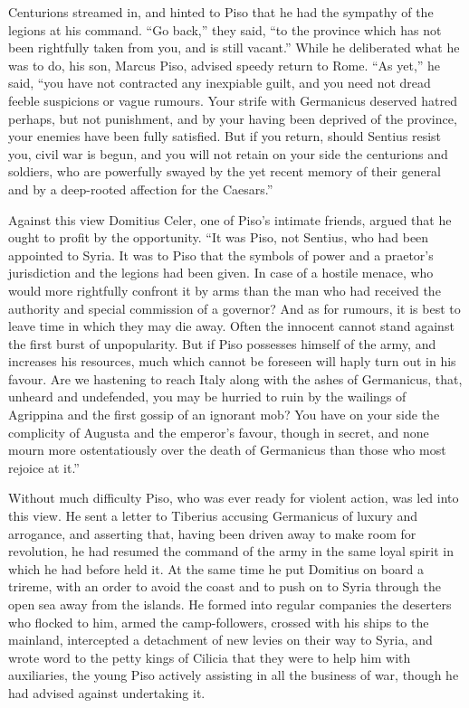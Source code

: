 
Centurions streamed in, and hinted to Piso that he had the sympathy of the legions at his command. ``Go back,'' they said, ``to the province which has not been rightfully taken from you, and is still vacant.'' While he deliberated what he was to do, his son, Marcus Piso, advised speedy return to Rome. ``As yet,'' he said, ``you have not contracted any inexpiable guilt, and you need not dread feeble suspicions or vague rumours. Your strife with Germanicus deserved hatred perhaps, but not punishment, and by your having been deprived of the province, your enemies have been fully satisfied. But if you return, should Sentius resist you, civil war is begun, and you will not retain on your side the centurions and soldiers, who are powerfully swayed by the yet recent memory of their general and by a deep-rooted affection for the Caesars.''


Against this view Domitius Celer, one of Piso's intimate friends, argued that he ought to profit by the opportunity. ``It was Piso, not Sentius, who had been appointed to Syria. It was to Piso that the symbols of power and a praetor's jurisdiction and the legions had been given. In case of a hostile menace, who would more rightfully confront it by arms than the man who had received the authority and special commission of a governor? And as for rumours, it is best to leave time in which they may die away. Often the innocent cannot stand against the first burst of unpopularity. But if Piso possesses himself of the army, and increases his resources, much which cannot be foreseen will haply turn out in his favour. Are we hastening to reach Italy along with the ashes of Germanicus, that, unheard and undefended, you may be hurried to ruin by the wailings of Agrippina and the first gossip of an ignorant mob? You have on your side the complicity of Augusta and the emperor's favour, though in secret, and none mourn more ostentatiously over the death of Germanicus than those who most rejoice at it.''


Without much difficulty Piso, who was ever ready for violent action, was led into this view. He sent a letter to Tiberius accusing Germanicus of luxury and arrogance, and asserting that, having been driven away to make room for revolution, he had resumed the command of the army in the same loyal spirit in which he had before held it. At the same time he put Domitius on board a trireme, with an order to avoid the coast and to push on to Syria through the open sea away from the islands. He formed into regular companies the deserters who flocked to him, armed the camp-followers, crossed with his ships to the mainland, intercepted a detachment of new levies on their way to Syria, and wrote word to the petty kings of Cilicia that they were to help him with auxiliaries, the young Piso actively assisting in all the business of war, though he had advised against undertaking it.

